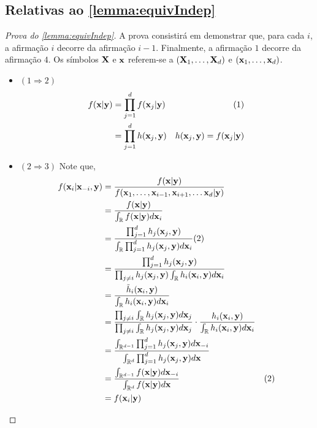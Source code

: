\subsection{Relativas ao \cref{lemma:equivIndep}}

\begin{proof}[Prova do \cref{lemma:equivIndep}]
 A prova consistirá em demonstrar que,
 para cada $i$, a afirmação $i$ decorre da afirmação $i-1$.
 Finalmente, a afirmação $1$ decorre da afirmação $4$.
 Os símbolos ${\mathbf{X}}$ e ${\mathbf{x}}$ referem-se a 
 $({\mathbf{X}}_1,\ldots,{\mathbf{X}}_d)$ e $({\mathbf{x}}_1,\ldots,{\mathbf{x}}_d)$. 
 \begin{itemize}
  \item $(1 \Longrightarrow 2)$
	\begin{align*}
	 f({\mathbf{x}}|{\mathbf{y}})	&= \prod_{j=1}^{d}{f({\mathbf{x}}_j|{\mathbf{y}})}  & (1) \\
	          &= \prod_{j=1}^{d}{h({\mathbf{x}}_j,{\mathbf{y}})}
	          & h({\mathbf{x}}_j,{\mathbf{y}}) = f({\mathbf{x}}_j|{\mathbf{y}})
	\end{align*}
	\vspace{-5mm}
  \item $(2 \Longrightarrow 3)$ Note que,
	\begin{align*}
	 f({\mathbf{x}}_i|{\mathbf{x}}_{-i},{\mathbf{y}})	
	 &= \frac{f({\mathbf{x}}|{\mathbf{y}})}{f({\mathbf{x}}_1,\ldots,{\mathbf{x}}_{i-1},{\mathbf{x}}_{i+1},\ldots{\mathbf{x}}_d|{\mathbf{y}})}	\\
	 &= \frac{f({\mathbf{x}}|{\mathbf{y}})}{\int_{\mathbb{R}}{f({\mathbf{x}}|{\mathbf{y}})d{\mathbf{x}}_i}} \\
	 &= \frac{\prod_{j=1}^{d}{h_j({\mathbf{x}}_j,{\mathbf{y}})}}
	 {\int_{\mathbb{R}}{\prod_{j=1}^{d}{h_j({\mathbf{x}}_j,{\mathbf{y}})}d{\mathbf{x}}_i}} (2) \\
	 &= \frac{\prod_{j=1}^{d}{h_j({\mathbf{x}}_j,{\mathbf{y}})}}
	 {\prod_{j \neq i}{h_j({\mathbf{x}}_j,{\mathbf{y}})} \int_{\mathbb{R}}{h_i({\mathbf{x}}_i,{\mathbf{y}})d{\mathbf{x}}_i}}	\\
	 &= \frac{\tilde{h}_i({\mathbf{x}}_i,{\mathbf{y}})}{\int_{\mathbb{R}}{h_i({\mathbf{x}}_i,{\mathbf{y}})d{\mathbf{x}}_i}}	\\
	 &= \frac{\prod_{j \neq i}{\int_{\mathbb{R}}{h_j({\mathbf{x}}_j,{\mathbf{y}})d{\mathbf{x}}_j}}}
	 {\prod_{j \neq i}{\int_{\mathbb{R}}{h_j({\mathbf{x}}_j,{\mathbf{y}})d{\mathbf{x}}_j}}} \cdot 
	 \frac{h_i({\mathbf{x}}_i,{\mathbf{y}})}{\int_{\mathbb{R}}{h_i({\mathbf{x}}_i,{\mathbf{y}})d{\mathbf{x}}_i}}	\\
	 &= \frac{\int_{\mathbb{R}^{d-1}}{\prod_{j=1}^{d}{h_j({\mathbf{x}}_j,{\mathbf{y}})}d{\mathbf{x}}_{-i}}}
	 {\int_{\mathbb{R}^{d}}{\prod_{j=1}^{d}{h_j({\mathbf{x}}_j,{\mathbf{y}})}d{\mathbf{x}}}}	\\
	 &= \frac{\int_{\mathbb{R}^{d-1}}{f({\mathbf{x}}|{\mathbf{y}})d{\mathbf{x}}_{-i}}}
	 {\int_{\mathbb{R}^{d}}{f({\mathbf{x}}|{\mathbf{y}})d{\mathbf{x}}}} & (2) \\
	 &= f({\mathbf{x}}_i|{\mathbf{y}})
	\end{align*}


\end{itemize}
\end{proof}
